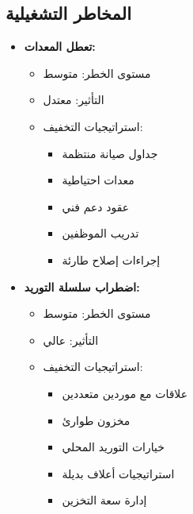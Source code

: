 \subsection{المخاطر التشغيلية}
\begin{itemize}
    \item \textbf{تعطل المعدات:}
    \begin{itemize}
        \item مستوى الخطر: متوسط
        \item التأثير: معتدل
        \item استراتيجيات التخفيف:
        \begin{itemize}
            \item جداول صيانة منتظمة
            \item معدات احتياطية
            \item عقود دعم فني
            \item تدريب الموظفين
            \item إجراءات إصلاح طارئة
        \end{itemize}
    \end{itemize}
    
    \item \textbf{اضطراب سلسلة التوريد:}
    \begin{itemize}
        \item مستوى الخطر: متوسط
        \item التأثير: عالي
        \item استراتيجيات التخفيف:
        \begin{itemize}
            \item علاقات مع موردين متعددين
            \item مخزون طوارئ
            \item خيارات التوريد المحلي
            \item استراتيجيات أعلاف بديلة
            \item إدارة سعة التخزين
        \end{itemize}
    \end{itemize}
\end{itemize}

